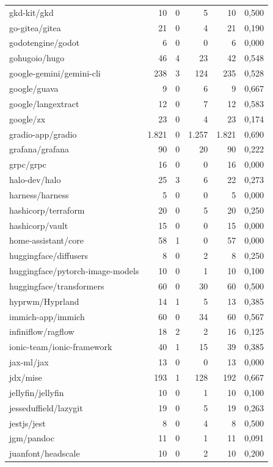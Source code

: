 \begin{tabular}{lrrrrr}
gkd-kit/gkd & 10 & 0 & 5 & 10 & 0,500 \\
go-gitea/gitea & 21 & 0 & 4 & 21 & 0,190 \\
godotengine/godot & 6 & 0 & 0 & 6 & 0,000 \\
gohugoio/hugo & 46 & 4 & 23 & 42 & 0,548 \\
google-gemini/gemini-cli & 238 & 3 & 124 & 235 & 0,528 \\
google/guava & 9 & 0 & 6 & 9 & 0,667 \\
google/langextract & 12 & 0 & 7 & 12 & 0,583 \\
google/zx & 23 & 0 & 4 & 23 & 0,174 \\
gradio-app/gradio & 1.821 & 0 & 1.257 & 1.821 & 0,690 \\
grafana/grafana & 90 & 0 & 20 & 90 & 0,222 \\
grpc/grpc & 16 & 0 & 0 & 16 & 0,000 \\
halo-dev/halo & 25 & 3 & 6 & 22 & 0,273 \\
harness/harness & 5 & 0 & 0 & 5 & 0,000 \\
hashicorp/terraform & 20 & 0 & 5 & 20 & 0,250 \\
hashicorp/vault & 15 & 0 & 0 & 15 & 0,000 \\
home-assistant/core & 58 & 1 & 0 & 57 & 0,000 \\
huggingface/diffusers & 8 & 0 & 2 & 8 & 0,250 \\
huggingface/pytorch-image-models & 10 & 0 & 1 & 10 & 0,100 \\
huggingface/transformers & 60 & 0 & 30 & 60 & 0,500 \\
hyprwm/Hyprland & 14 & 1 & 5 & 13 & 0,385 \\
immich-app/immich & 60 & 0 & 34 & 60 & 0,567 \\
infiniflow/ragflow & 18 & 2 & 2 & 16 & 0,125 \\
ionic-team/ionic-framework & 40 & 1 & 15 & 39 & 0,385 \\
jax-ml/jax & 13 & 0 & 0 & 13 & 0,000 \\
jdx/mise & 193 & 1 & 128 & 192 & 0,667 \\
jellyfin/jellyfin & 10 & 0 & 1 & 10 & 0,100 \\
jesseduffield/lazygit & 19 & 0 & 5 & 19 & 0,263 \\
jestjs/jest & 8 & 0 & 4 & 8 & 0,500 \\
jgm/pandoc & 11 & 0 & 1 & 11 & 0,091 \\
juanfont/headscale & 10 & 0 & 2 & 10 & 0,200 \\

\end{tabular}
